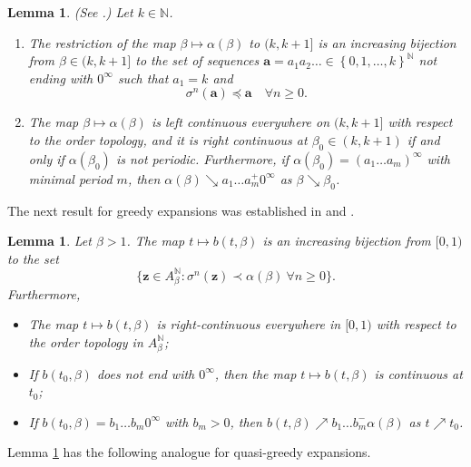 \documentclass[12pt]{amsart}
\newtheorem{lemma}[theorem]{Lemma}
\theoremstyle{definition}
\theoremstyle{remark}
\numberwithin{equation}{section}
\newcommand{\N}{\ensuremath{\mathbb{N}}}
\renewcommand{\a}{ {\mathbf{a}}}
\newcommand{\z}{\mathbf{z}}
\newcommand{\set}[1]{\left\{#1\right\}}
\newcommand{\f}{\infty}
\newcommand{\al}{\alpha}
\newcommand{\lle}{\preccurlyeq}
\renewcommand{\a}{ \mathbf{a}}
\newcommand{\si}{\sigma}
\begin{document}
{\begin{lemma} \label{lem:quasi-greedy-expansion-of-1}%
(See \cite{Baiocchi_Komornik_2007}.) Let $k\in\N$.
\begin{enumerate}[{\rm(i)}]
\item The restriction of the map $\beta\mapsto\al(\beta)$ to $(k,k+1]$ is an increasing bijection from $\beta\in (k,k+1]$ to the set of sequences $\a=a_1a_2\dots\in\set{0,1,\dots,k}^\N$ not ending with $0^\f$ such that $a_1=k$ and
\[
\si^n(\a)\lle \a\quad \forall n\ge 0.
\]
\item The map $\beta\mapsto\al(\beta)$ is left continuous everywhere on $(k,k+1]$ with respect to the order topology, and it is right continuous at $\beta_0\in(k,k+1)$ if and only if $\al(\beta_0)$ is not periodic. Furthermore, if $\al(\beta_0)=(a_1\ldots a_m)^\f$ with minimal period $m$, then $\al(\beta)\searrow a_1\ldots a_m^+ 0^\f$ as $\beta\searrow \beta_0$.
\end{enumerate}
\end{lemma}

The next result for greedy expansions was established in \cite{Parry_1960} and \cite[Lemma 2.5 and Proposition 2.6]{DeVries-Komornik-2011}.

\begin{lemma} \label{lem:greedy-expansion}
Let $\beta>1$. The map $t\mapsto b(t,\beta)$ is an increasing bijection from $[0,1)$ to the set
\[
\big\{\z\in A_\beta^\N: \si^n(\z)\prec \al(\beta)~\forall n\ge 0\big\}.
\]
Furthermore,
\begin{itemize}
  \item [{\rm(i)}] The map $t\mapsto b(t,\beta)$ is right-continuous everywhere in $[0,1)$ with respect to the order topology in $A_\beta^\N$;
  \item [{\rm(ii)}] If $b(t_0,\beta)$ does not end with $0^\f$, then the map $t\mapsto b(t,\beta)$ is continuous at $t_0$;
	\item [{\rm(iii)}] If $b(t_0,\beta)=b_1\ldots b_m 0^\f$ with $b_m>0$, then $b(t, \beta)\nearrow b_1\ldots b_m^-\al(\beta)$ as $t\nearrow t_0$.
\end{itemize}
\end{lemma}

Lemma \ref{lem:greedy-expansion} has the following analogue for quasi-greedy expansions.

}
\end{document}

